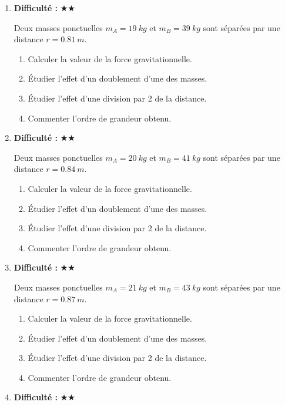 \documentclass[11pt,a4paper]{article}
\newcommand{\etoiles}[1]{\textbf{Difficulté : }#1}
\begin{document}
\begin{enumerate}[label=\textbf{Exercice \arabic*.},leftmargin=*]
Deux masses ponctuelles $m_A=18\ \si{kg}$ et $m_B=37\ \si{kg}$ sont séparées par une distance $r=0.78\ \si{m}$.
\begin{enumerate}[label=\alph*)]
\item Calculer la valeur de la force gravitationnelle.
\item Étudier l'effet d'un doublement d'une des masses.
\item Étudier l'effet d'une division par 2 de la distance.
\item Commenter l'ordre de grandeur obtenu.
\end{enumerate}
\item \etoiles{★★}

Deux masses ponctuelles $m_A=19\ \si{kg}$ et $m_B=39\ \si{kg}$ sont séparées par une distance $r=0.81\ \si{m}$.
\begin{enumerate}[label=\alph*)]
\item Calculer la valeur de la force gravitationnelle.
\item Étudier l'effet d'un doublement d'une des masses.
\item Étudier l'effet d'une division par 2 de la distance.
\item Commenter l'ordre de grandeur obtenu.
\end{enumerate}
\item \etoiles{★★}

Deux masses ponctuelles $m_A=20\ \si{kg}$ et $m_B=41\ \si{kg}$ sont séparées par une distance $r=0.84\ \si{m}$.
\begin{enumerate}[label=\alph*)]
\item Calculer la valeur de la force gravitationnelle.
\item Étudier l'effet d'un doublement d'une des masses.
\item Étudier l'effet d'une division par 2 de la distance.
\item Commenter l'ordre de grandeur obtenu.
\end{enumerate}
\item \etoiles{★★}

Deux masses ponctuelles $m_A=21\ \si{kg}$ et $m_B=43\ \si{kg}$ sont séparées par une distance $r=0.87\ \si{m}$.
\begin{enumerate}[label=\alph*)]
\item Calculer la valeur de la force gravitationnelle.
\item Étudier l'effet d'un doublement d'une des masses.
\item Étudier l'effet d'une division par 2 de la distance.
\item Commenter l'ordre de grandeur obtenu.
\end{enumerate}
\item \etoiles{★★}


\end{enumerate}
\end{document}

